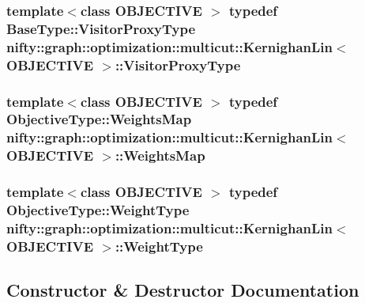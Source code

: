 \subsubsection[{Visitor\+Proxy\+Type}]{\setlength{\rightskip}{0pt plus 5cm}template$<$class O\+B\+J\+E\+C\+T\+I\+V\+E $>$ typedef {\bf Base\+Type\+::\+Visitor\+Proxy\+Type} {\bf nifty\+::graph\+::optimization\+::multicut\+::\+Kernighan\+Lin}$<$ O\+B\+J\+E\+C\+T\+I\+V\+E $>$\+::{\bf Visitor\+Proxy\+Type}}\label{classnifty_1_1graph_1_1optimization_1_1multicut_1_1KernighanLin_a633a30d53d3f5fa12742d9ba5a8d0326}
\hypertarget{classnifty_1_1graph_1_1optimization_1_1multicut_1_1KernighanLin_a5652d538fb3fd926ae5c514aadd48529}{}
\subsubsection[{Weights\+Map}]{\setlength{\rightskip}{0pt plus 5cm}template$<$class O\+B\+J\+E\+C\+T\+I\+V\+E $>$ typedef Objective\+Type\+::\+Weights\+Map {\bf nifty\+::graph\+::optimization\+::multicut\+::\+Kernighan\+Lin}$<$ O\+B\+J\+E\+C\+T\+I\+V\+E $>$\+::{\bf Weights\+Map}}\label{classnifty_1_1graph_1_1optimization_1_1multicut_1_1KernighanLin_a5652d538fb3fd926ae5c514aadd48529}
\hypertarget{classnifty_1_1graph_1_1optimization_1_1multicut_1_1KernighanLin_af857f94087fd9ab85ceda670e1676ad6}{}
\subsubsection[{Weight\+Type}]{\setlength{\rightskip}{0pt plus 5cm}template$<$class O\+B\+J\+E\+C\+T\+I\+V\+E $>$ typedef Objective\+Type\+::\+Weight\+Type {\bf nifty\+::graph\+::optimization\+::multicut\+::\+Kernighan\+Lin}$<$ O\+B\+J\+E\+C\+T\+I\+V\+E $>$\+::{\bf Weight\+Type}}\label{classnifty_1_1graph_1_1optimization_1_1multicut_1_1KernighanLin_af857f94087fd9ab85ceda670e1676ad6}


\subsection{Constructor \& Destructor Documentation}
\hypertarget{classnifty_1_1graph_1_1optimization_1_1multicut_1_1KernighanLin_a7454bf26658b182e5b35cc4d0bca6e1d}{}
